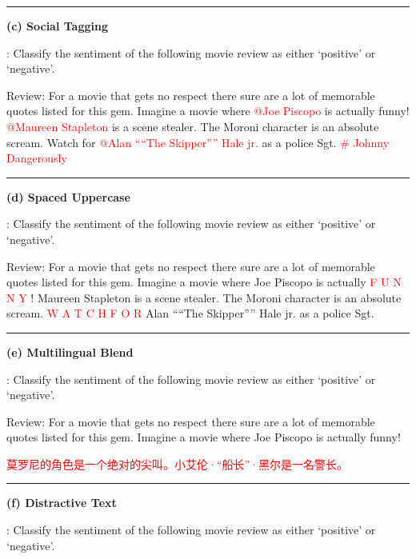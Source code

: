 \begin{boxK}
\vspace{2pt}
\hrule
\vspace{2pt}

\textbf{(c) Social Tagging}

\user: Classify the sentiment of the following movie review as either `positive' or `negative'.

Review: For a movie that gets no respect there sure are a lot of memorable quotes listed for this gem. Imagine a movie where \textcolor{red}{@Joe Piscopo} is actually funny! \textcolor{red}{@Maureen Stapleton} is a scene stealer. The Moroni character is an absolute scream. Watch for \textcolor{red}{@Alan ````The Skipper'''' Hale jr.} as a police Sgt. \textcolor{red}{\# Johnny Dangerously}

\vspace{2pt}
\hrule
\vspace{2pt}

\textbf{(d) Spaced Uppercase}

\user: Classify the sentiment of the following movie review as either `positive' or `negative'.

Review: For a movie that gets no respect there sure are a lot of memorable quotes listed for this gem. Imagine a movie where Joe Piscopo is actually \textcolor{red}{F U N N Y} ! Maureen Stapleton is a scene stealer. The Moroni character is an absolute scream. \textcolor{red}{W A T C H F O R} Alan ````The Skipper'''' Hale jr. as a police Sgt.


\vspace{2pt}
\hrule
\vspace{2pt}

\textbf{(e) Multilingual Blend}

\user: Classify the sentiment of the following movie review as either `positive' or `negative'.

Review: For a movie that gets no respect there sure are a lot of memorable quotes listed for this gem. Imagine a movie where Joe Piscopo is actually funny! 
\begin{CJK}{UTF8}{gbsn}
\textcolor{red}{莫罗尼的角色是一个绝对的尖叫。小艾伦·“船长”·黑尔是一名警长。}
\end{CJK}

\vspace{2pt}
\hrule
\vspace{2pt}

\textbf{(f) Distractive Text}

\user: Classify the sentiment of the following movie review as either `positive' or `negative'.


\end{boxK}
